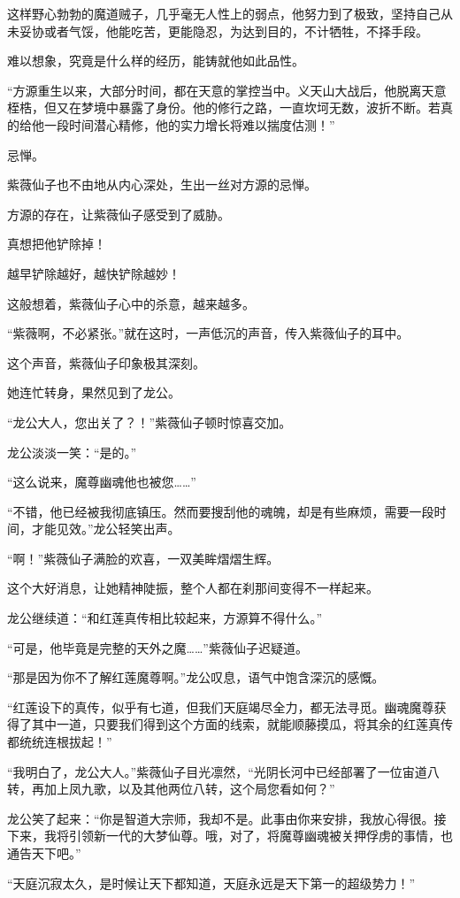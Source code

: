 \begin{this_body}
这样野心勃勃的魔道贼子，几乎毫无人性上的弱点，他努力到了极致，坚持自己从未妥协或者气馁，他能吃苦，更能隐忍，为达到目的，不计牺牲，不择手段。

难以想象，究竟是什么样的经历，能铸就他如此品性。

“方源重生以来，大部分时间，都在天意的掌控当中。义天山大战后，他脱离天意桎梏，但又在梦境中暴露了身份。他的修行之路，一直坎坷无数，波折不断。若真的给他一段时间潜心精修，他的实力增长将难以揣度估测！”

忌惮。

紫薇仙子也不由地从内心深处，生出一丝对方源的忌惮。

方源的存在，让紫薇仙子感受到了威胁。

真想把他铲除掉！

越早铲除越好，越快铲除越妙！

这般想着，紫薇仙子心中的杀意，越来越多。

“紫薇啊，不必紧张。”就在这时，一声低沉的声音，传入紫薇仙子的耳中。

这个声音，紫薇仙子印象极其深刻。

她连忙转身，果然见到了龙公。

“龙公大人，您出关了？！”紫薇仙子顿时惊喜交加。

龙公淡淡一笑：“是的。”

“这么说来，魔尊幽魂他也被您……”

“不错，他已经被我彻底镇压。然而要搜刮他的魂魄，却是有些麻烦，需要一段时间，才能见效。”龙公轻笑出声。

“啊！”紫薇仙子满脸的欢喜，一双美眸熠熠生辉。

这个大好消息，让她精神陡振，整个人都在刹那间变得不一样起来。

龙公继续道：“和红莲真传相比较起来，方源算不得什么。”

“可是，他毕竟是完整的天外之魔……”紫薇仙子迟疑道。

“那是因为你不了解红莲魔尊啊。”龙公叹息，语气中饱含深沉的感慨。

“红莲设下的真传，似乎有七道，但我们天庭竭尽全力，都无法寻觅。幽魂魔尊获得了其中一道，只要我们得到这个方面的线索，就能顺藤摸瓜，将其余的红莲真传都统统连根拔起！”

“我明白了，龙公大人。”紫薇仙子目光凛然，“光阴长河中已经部署了一位宙道八转，再加上凤九歌，以及其他两位八转，这个局您看如何？”

龙公笑了起来：“你是智道大宗师，我却不是。此事由你来安排，我放心得很。接下来，我将引领新一代的大梦仙尊。哦，对了，将魔尊幽魂被关押俘虏的事情，也通告天下吧。”

“天庭沉寂太久，是时候让天下都知道，天庭永远是天下第一的超级势力！”


\end{this_body}
